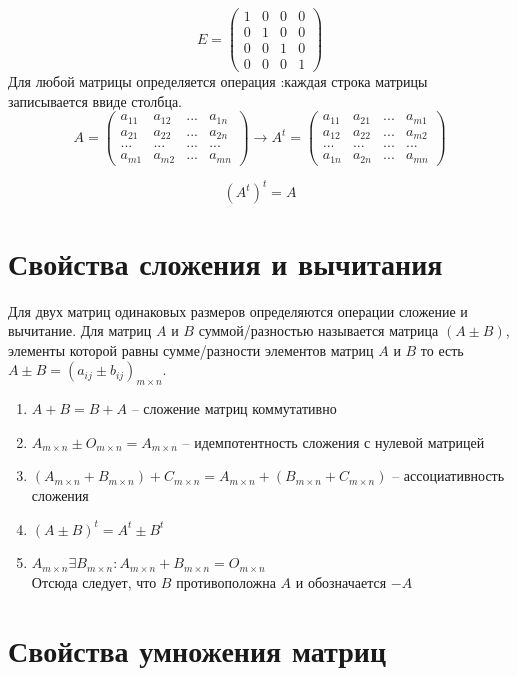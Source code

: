 \documentclass[oneside]{book}
\begin{document}
\begin{itemize}
\begin{enumerate}
$$ E =\begin{pmatrix} 1 & 0 & 0 & 0\\
0 & 1 & 0 & 0\\ 
0 & 0 & 1 & 0\\
0 & 0 & 0 & 1\end{pmatrix}$$
Для любой матрицы определяется операция :каждая строка матрицы записывается ввиде столбца.
$$A=\begin{pmatrix} a_{1 1} & a_{1 2} & ... & a_{1 n}\\
a_{2 1} & a_{2 2} & ... & a_{2 n}\\ 
... & ... & ... & ...\\
a_{m 1} & a_{m 2} & ... & a_{m n}\end{pmatrix}
\to A^{t}=\begin{pmatrix} a_{1 1} & a_{2 1} & ... & a_{m 1}\\
a_{1 2} & a_{2 2} & ... & a_{m 2}\\ 
... & ... & ... & ...\\
a_{1 n} & a_{2 n} & ... & a_{m n}\end{pmatrix}$$

$$(A^{t})^{t}=A$$
\section{Свойства сложения и вычитания}
Для двух матриц одинаковых размеров определяются операции сложение и вычитание. Для матриц $A$ и $B$ суммой/разностью называется матрица $(A\pm B)$, элементы которой равны сумме/разности элементов матриц $A$ и $B$ то есть $A\pm B=(a_{i j}\pm b_{i j})_{m\times n}$.
\begin{enumerate}
\item $A+B=B+A$ -- сложение матриц коммутативно
\item $A_{m\times n}\pm O_{m\times n}=A_{m\times n}$ -- идемпотентность сложения с нулевой матрицей
\item $(A_{m\times n}+B_{m\times n})+C_{m\times n}=A_{m\times n}+(B_{m\times n}+C_{m\times n})$ -- ассоциативность сложения
\item $(A\pm B)^{t}=A^{t}\pm B^{t}$
\item $A_{m\times n} \exists B_{m\times n}: A_{m\times n}+B_{m\times n}= O_{m\times n}$\\
Отсюда следует, что $B$ противоположна $A$ и обозначается $-A$
\end{enumerate}

\section{Свойства умножения матриц}

\end{enumerate}
\end{itemize}
\end{document}
